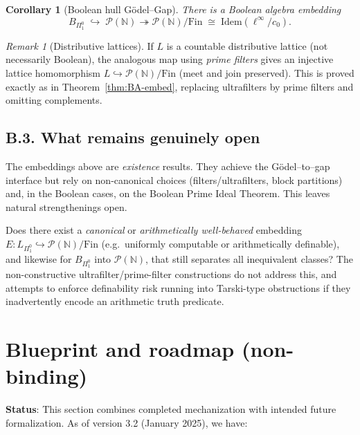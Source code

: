 \documentclass[11pt]{article}
\newtheorem{corollary}[theorem]{Corollary}
\theoremstyle{definition}
\theoremstyle{remark}
\newtheorem{remark}[theorem]{Remark}
\newcommand{\N}{\mathbb{N}}
\begin{document}
\begin{corollary}[Boolean hull Gödel--Gap]\label{cor:boolean-hull}
There is a Boolean algebra embedding
\[
  B_{\Pi^0_1} \;\hookrightarrow\; \mathcal{P}(\N) \twoheadrightarrow \mathcal{P}(\N)/\mathrm{Fin}
  \;\cong\; \mathrm{Idem}(\ell^\infty/c_0).
\]
\end{corollary}

\begin{remark}[Distributive lattices]\label{rem:DL}
If $L$ is a countable distributive lattice (not necessarily Boolean), the analogous map using \emph{prime filters} gives an injective lattice homomorphism $L\hookrightarrow \mathcal{P}(\N)/\mathrm{Fin}$ (meet and join preserved). This is proved exactly as in Theorem~\ref{thm:BA-embed}, replacing ultrafilters by prime filters and omitting complements.
\end{remark}

\subsection*{B.3. What remains genuinely open}

The embeddings above are \emph{existence} results. They achieve the Gödel--to--gap interface but rely on non-canonical choices (filters/ultrafilters, block partitions) and, in the Boolean cases, on the Boolean Prime Ideal Theorem. This leaves natural strengthenings open.

\begin{openproblem}\label{op:definability}
Does there exist a \emph{canonical} or \emph{arithmetically well-behaved} embedding
\(
  E : L_{\Pi^0_1}\hookrightarrow \mathcal{P}(\N)/\mathrm{Fin}
\)
(e.g.\ uniformly computable or arithmetically definable), and likewise for $B_{\Pi^0_1}$ into $\mathcal{P}(\N)$, that still separates all inequivalent classes?
The non-constructive ultrafilter/prime-filter constructions do not address this, and attempts to enforce definability risk running into Tarski-type obstructions if they inadvertently encode an arithmetic truth predicate.
\end{openproblem}

\section{Blueprint and roadmap (non-binding)}\label{sec:lean-blueprint}

\textbf{Status}: This section combines completed mechanization with intended future formalization. As of version 3.2 (January 2025), we have:
\end{document}
